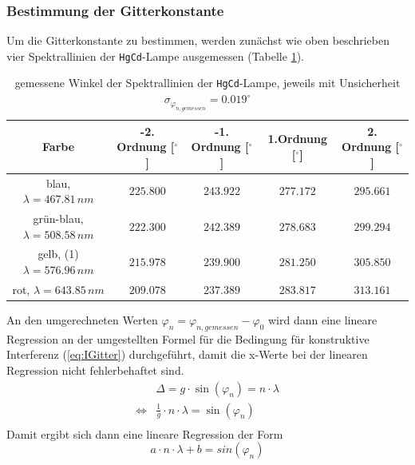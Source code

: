 \documentclass[a4paper, 11pt]{article}
\begin{document}
\subsubsection{Bestimmung der Gitterkonstante}
Um die Gitterkonstante zu bestimmen, werden zunächst wie oben beschrieben vier Spektrallinien der \texttt{HgCd}-Lampe ausgemessen (Tabelle \ref{table: gemWinkel}).
\begin{table}[H]
	\large
	\centering
	\begin{tabular}{|c|c|c|c|c|}
		\hline 
		Farbe & -2. Ordnung [$ ^\circ$]  &   -1. Ordnung [$ ^\circ$] &   1.Ordnung [$ ^\circ$]    &   2. Ordnung [$ ^\circ$] \\
 		\hline
 		blau, $\lambda = 467.81 \, nm$    &   $225.800 $   &   $243.922$    &   $277.172$    &   $295.661$ \\
		\hline grün-blau, $\lambda = 508.58 \, nm$    &   $222.300 $   &   $242.389$    &   $278.683$    &   $299.294$ \\
		\hline
		gelb, (1) $\lambda = 576.96 \, nm$    &   $215.978 $   &   $239.900$    &   $281.250$    &   $305.850$ \\
		\hline
		rot, $\lambda = 643.85 \, nm$    &   $209.078 $   &   $237.389$    &   $283.817$    &   $313.161$ \\
		\hline
	\end{tabular}
	\caption{gemessene Winkel der Spektrallinien der \texttt{HgCd}-Lampe, jeweils mit Unsicherheit $\sigma_{\varphi_{n, gemessen}} = 0.019^{\circ}$}
	\label{table: gemWinkel}
\end{table}

An den umgerechneten Werten $\varphi_n = \varphi_{n, gemessen} - \varphi_0$ wird dann eine lineare Regression an der umgestellten Formel für die Bedingung für konstruktive Interferenz (\ref{eq:IGitter}) durchgeführt, damit die x-Werte bei der linearen Regression nicht fehlerbehaftet sind.
\begin{eqnarray*}
	& \Delta = g \cdot \sin(\varphi_n) = n \cdot \lambda \\
	\Leftrightarrow & \frac{1}{g} \cdot n \cdot \lambda = \sin(\varphi_n)\\
\end{eqnarray*}
\textwidth
Damit ergibt sich dann eine lineare Regression der Form
\begin{equation*}
a \cdot n \cdot \lambda + b = sin(\varphi_n)
\end{equation*}
\end{document}
